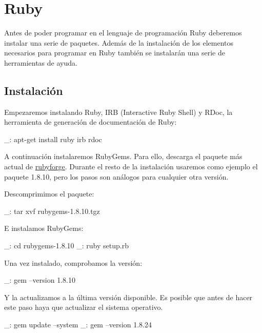 \chapter{Ruby}
\label{anx:ruby}

Antes de poder programar en el lenguaje de programación Ruby deberemos instalar una serie de paquetes. Además de la instalación de los elementos necesarios para programar en Ruby también se instalarán una serie de herramientas de ayuda.


\section{Instalación}

Empezaremos instalando Ruby, IRB (Interactive Ruby Shell) y RDoc, la herramienta de generación de documentación de Ruby:

\begin{bashcode}
_: apt-get install ruby irb rdoc
\end{bashcode}

A continuación instalaremos RubyGems. Para ello, descarga el paquete más actual de \href{http://rubyforge.org/frs/?group_id=126}{rubyforge}. Durante el resto de la instalación usaremos como ejemplo el paquete 1.8.10, pero los pasos son análogos para cualquier otra versión.

Descomprimimos el paquete:

\begin{bashcode}
_: tar xvf rubygems-1.8.10.tgz
\end{bashcode}

E instalamos RubyGems:

\begin{bashcode}
_: cd rubygems-1.8.10
_: ruby setup.rb
\end{bashcode}

Una vez instalado, comprobamos la versión:

\begin{bashcode}
_: gem --version
1.8.10
\end{bashcode}

Y la actualizamos a la última versión disponible. Es posible que antes de hacer este paso haya que actualizar el sistema operativo.

\begin{bashcode}
_: gem update --system
_: gem --version
1.8.24
\end{bashcode}

